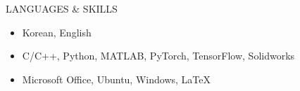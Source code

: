 \begin{rSection}{LANGUAGES \& SKILLS}
	
	\begin{itemize}
		\item Korean, English
		\item C/C++, Python, MATLAB, PyTorch, TensorFlow, Solidworks 
		\item Microsoft Office, Ubuntu, Windows, \LaTeX
	\end{itemize}
		
\end{rSection}

